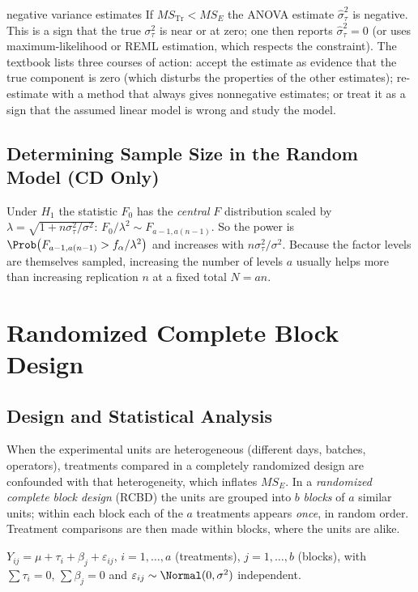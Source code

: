 \begin{pitfall}{negative variance estimates}
If $MS_{\mathrm{Tr}}<MS_E$ the ANOVA estimate $\hat\sigma_\tau^2$ is negative. This is a sign that the true $\sigma_\tau^2$ is near or at zero; one then reports $\hat\sigma_\tau^2=0$ (or uses maximum-likelihood or REML estimation, which respects the constraint). The textbook lists three courses of action: accept the estimate as evidence that the true component is zero (which disturbs the properties of the other estimates); re-estimate with a method that always gives nonnegative estimates; or treat it as a sign that the assumed linear model is wrong and study the model.
\end{pitfall}

\subsection{Determining Sample Size in the Random Model (CD Only)}

Under $H_1$ the statistic $F_0$ has the \emph{central} $F$ distribution scaled by $\lambda=\sqrt{1+n\sigma_\tau^2/\sigma^2}$: $F_0/\lambda^2\sim F_{a-1,a(n-1)}$. So the power is $\Prob\big(F_{a-1,a(n-1)}>f_{\alpha}/\lambda^2\big)$ and increases with $n\sigma_\tau^2/\sigma^2$. Because the factor levels are themselves sampled, increasing the number of levels $a$ usually helps more than increasing replication $n$ at a fixed total $N=an$.

\section{Randomized Complete Block Design}\label{sec:rcbd}

\subsection{Design and Statistical Analysis}

When the experimental units are heterogeneous (different days, batches, operators), treatments compared in a completely randomized design are confounded with that heterogeneity, which inflates $MS_E$. In a \emph{randomized complete block design} (RCBD) the units are grouped into $b$ \emph{blocks} of $a$ similar units; within each block each of the $a$ treatments appears \emph{once}, in random order. Treatment comparisons are then made within blocks, where the units are alike.

\begin{definition}
$Y_{ij}=\mu+\tau_i+\beta_j+\varepsilon_{ij}$, $i=1,\dots,a$ (treatments), $j=1,\dots,b$ (blocks), with $\sum\tau_i=0$, $\sum\beta_j=0$ and $\varepsilon_{ij}\sim\Normal(0,\sigma^2)$ independent.
\end{definition}

